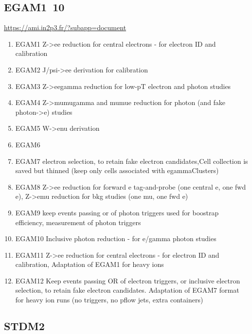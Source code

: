 \documentclass{ctexart}
\begin{document}
\subsection{EGAM1~10}
\url{https://ami.in2p3.fr/?subapp=document}
\begin{enumerate}
    \item EGAM1  Z->ee reduction for central electrons - for electron ID and calibration
    \item EGAM2  J/psi->ee derivation for calibration
    \item EGAM3  Z->eegamma reduction for low-pT electron and photon studies
    \item EGAM4  Z->mumugamma and mumue reduction for photon (and fake photon->e) studies
    \item EGAM5  W->enu derivation
    \item EGAM6  
    \item EGAM7  electron selection, to retain fake electron candidates,Cell collection is saved but thinned (keep only cells associated with egammaClusters)
    \item EGAM8  Z->ee reduction for forward e tag-and-probe (one central e, one fwd e), Z->emu reduction for bkg studies (one mu, one fwd e)
    \item EGAM9  keep events passing or of photon triggers used for boostrap efficiency, measurement of photon triggers
    \item EGAM10 Inclusive photon reduction - for e/gamma photon studies
    \item EGAM11 Z->ee reduction for central electrons - for electron ID and calibration, Adaptation of EGAM1 for heavy ions
    \item EGAM12 Keep events passing OR of electron triggers, or inclusive electron selection, to retain fake electron candidates. Adaptation of EGAM7 format for heavy ion runs (no triggers, no pflow jets, extra containers)


\end{enumerate}
\subsection{STDM2}
\end{document}
